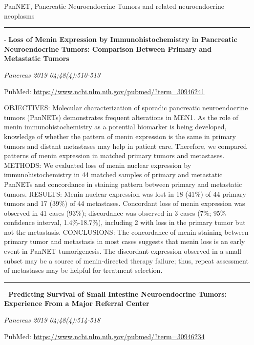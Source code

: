 \documentclass[]{article}
\begin{document}
PanNET, Pancreatic Neuroendocrine Tumors and related neuroendocrine
neoplasms

\begin{center}\rule{0.5\linewidth}{\linethickness}\end{center}

 - \textbf{Loss of Menin Expression by Immunohistochemistry in
Pancreatic Neuroendocrine Tumors: Comparison Between Primary and
Metastatic Tumors}

\emph{Pancreas 2019 04;48(4):510-513}

PubMed: \url{https://www.ncbi.nlm.nih.gov/pubmed/?term=30946241}

OBJECTIVES: Molecular characterization of sporadic pancreatic
neuroendocrine tumors (PanNETs) demonstrates frequent alterations in
MEN1. As the role of menin immunohistochemistry as a potential biomarker
is being developed, knowledge of whether the pattern of menin expression
is the same in primary tumors and distant metastases may help in patient
care. Therefore, we compared patterns of menin expression in matched
primary tumors and metastases. METHODS: We evaluated loss of menin
nuclear expression by immunohistochemistry in 44 matched samples of
primary and metastatic PanNETs and concordance in staining pattern
between primary and metastatic tumors. RESULTS: Menin nuclear expression
was lost in 18 (41\%) of 44 primary tumors and 17 (39\%) of 44
metastases. Concordant loss of menin expression was observed in 41 cases
(93\%); discordance was observed in 3 cases (7\%; 95\% confidence
interval, 1.4\%-18.7\%), including 2 with loss in the primary tumor but
not the metastasis. CONCLUSIONS: The concordance of menin staining
between primary tumor and metastasis in most cases suggests that menin
loss is an early event in PanNET tumorigenesis. The discordant
expression observed in a small subset may be a source of menin-directed
therapy failure; thus, repeat assessment of metastases may be helpful
for treatment selection.

{}

{}

\begin{center}\rule{0.5\linewidth}{\linethickness}\end{center}

 - \textbf{Predicting Survival of Small Intestine Neuroendocrine Tumors:
Experience From a Major Referral Center}

\emph{Pancreas 2019 04;48(4):514-518}

PubMed: \url{https://www.ncbi.nlm.nih.gov/pubmed/?term=30946234}
\end{document}
